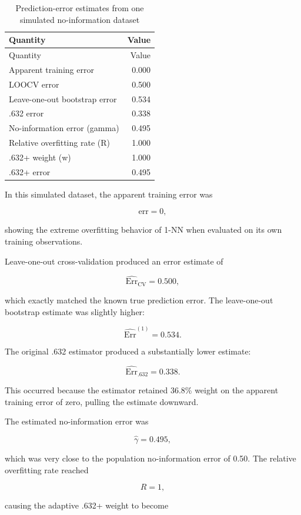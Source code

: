 \documentclass[
  letterpaper,
  DIV=11,
  numbers=noendperiod]{scrreprt}
\begin{document}
\begin{longtable}[]{@{}lr@{}}
\caption{Prediction-error estimates from one simulated no-information
dataset}\tabularnewline
\toprule\noalign{}
Quantity & Value \\
\midrule\noalign{}
\endfirsthead
\toprule\noalign{}
Quantity & Value \\
\midrule\noalign{}
\endhead
\bottomrule\noalign{}
\endlastfoot
Apparent training error & 0.000 \\
LOOCV error & 0.500 \\
Leave-one-out bootstrap error & 0.534 \\
.632 error & 0.338 \\
No-information error (gamma) & 0.495 \\
Relative overfitting rate (R) & 1.000 \\
.632+ weight (w) & 1.000 \\
.632+ error & 0.495 \\
\end{longtable}

In this simulated dataset, the apparent training error was

\[
\mathrm{err}=0,
\]

showing the extreme overfitting behavior of 1-NN when evaluated on its
own training observations.

Leave-one-out cross-validation produced an error estimate of

\[
\widehat{\mathrm{Err}}_{\mathrm{CV}}=0.500,
\]

which exactly matched the known true prediction error. The leave-one-out
bootstrap estimate was slightly higher:

\[
\widehat{\mathrm{Err}}^{(1)}=0.534.
\]

The original .632 estimator produced a substantially lower estimate:

\[
\widehat{\mathrm{Err}}_{.632}=0.338.
\]

This occurred because the estimator retained 36.8\% weight on the
apparent training error of zero, pulling the estimate downward.

The estimated no-information error was

\[
\widehat{\gamma}=0.495,
\]

which was very close to the population no-information error of 0.50. The
relative overfitting rate reached

\[
R=1,
\]

causing the adaptive .632+ weight to become
\end{document}
